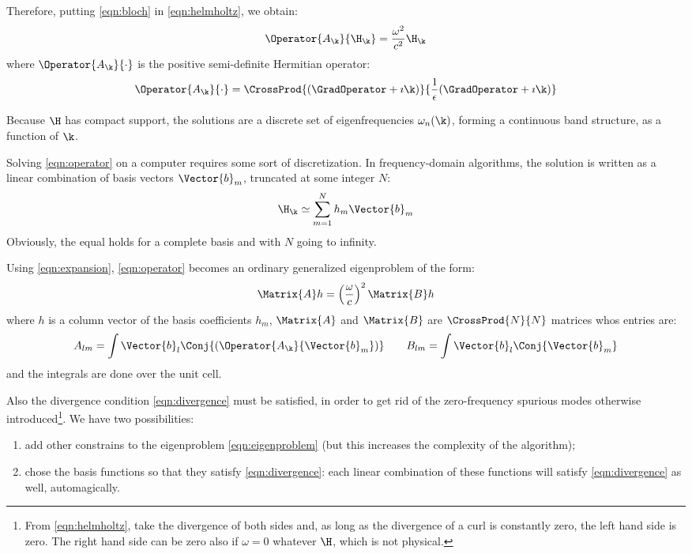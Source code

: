 Therefore, putting \ref{eqn:bloch} in \ref{eqn:helmholtz}, we obtain:
\begin{equation} \label{eqn:operator}
  \Operator{A_{\k}}{\H_{\k}} = \frac{\omega^2}{c^2} \H_{\k}
\end{equation}
where $\Operator{A_{\k}}{\cdot}$ is the positive semi-definite Hermitian
operator:
$$
\Operator{A_{\k}}{\cdot} = \CrossProd{(\GradOperator + \imath
  \k)}{\frac{1}{\epsilon}(\GradOperator + \imath \k)}
$$


Because $\H$ has compact support, the solutions are a discrete set of
eigenfrequencies $\omega_n(\k)$, forming a continuous band structure,
as a function of $\k$.

Solving \ref{eqn:operator} on a computer requires some sort of
discretization. In frequency-domain algorithms, the solution is
written as a linear combination of basis vectors $\Vector{b}_m$,
truncated at some integer $N$:
\begin{equation} \label{eqn:expansion}
\H_{\k} \simeq \sum_{m=1}^N h_m \Vector{b}_m
\end{equation}
Obviously, the equal holds for a complete basis and with $N$ going to
infinity.

Using \ref{eqn:expansion}, \ref{eqn:operator} becomes an ordinary
generalized eigenproblem of the form:
\begin{equation} \label{eqn:eigenproblem}
  \Matrix{A} h = \left(\frac{\omega}{c}\right)^2 \Matrix{B} h
\end{equation}
where $h$ is a column vector of the basis coefficients $h_m$,
$\Matrix{A}$ and $\Matrix{B}$ are $\CrossProd{N}{N}$ matrices whos
entries are:
$$
A_{lm} =
\int{\Vector{b}_l\Conj{\left(\Operator{A_{\k}}{\Vector{b}_m}\right)}}
\qquad B_{lm} = \int{\Vector{b}_l\Conj{{\Vector{b}_m}}}
$$
and the integrals are done over the unit cell.

Also the divergence condition \ref{eqn:divergence} must be satisfied,
in order to get rid of the zero-frequency spurious modes otherwise
introduced\footnote{From \ref{eqn:helmholtz}, take the divergence of both
  sides and, as long as the divergence of a curl is constantly zero,
  the left hand side is zero. The right hand side can be zero also if
  $\omega = 0$ whatever $\H$, which is not physical.}. We have two
possibilities:
\begin{enumerate}
\item
  add other constrains to the eigenproblem \ref{eqn:eigenproblem} (but
  this increases the complexity of the algorithm);
\item
  chose the basis functions so that they satisfy \ref{eqn:divergence}:
  each linear combination of these functions will satisfy
  \ref{eqn:divergence} as well, automagically.
\end{enumerate}

